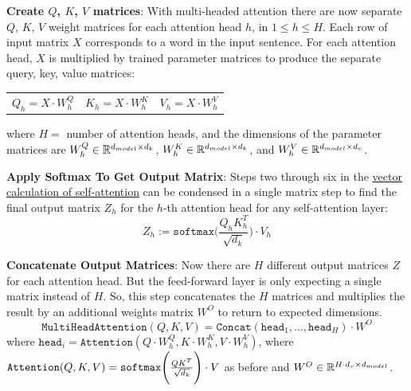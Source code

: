\begin{enumerateSpaced}{3pt}
    \item \textbf{Create $Q$, $K$, $V$ matrices}: With multi-headed attention there are now separate $Q$, $K$, $V$ weight matrices for each attention head $h$, in $1 \leq h \leq H$. Each row of input matrix $X$ corresponds to a word in the input sentence. For each attention head, $X$ is multiplied by trained parameter matrices to produce the separate query, key, value matrices: 
    \begin{center}
    \begin{tabular}{ c  c  c }
    $Q_h = X \cdot W_h^Q$
    &
    $K_h = X \cdot W_h^K $
    &
    $V_h = X \cdot W_h^V $
    \end{tabular}
    \end{center}\label{eq:QKVMultihead}

    where $H =$ number of attention heads, and the dimensions of the parameter matrices are $\large W_h^Q \in \mathbb{R}^{\Large d_{model} \times d_k}$, $\large W_h^K \in \mathbb{R}^{\Large d_{model} \times d_k}$, and $\large W_h^V \in \mathbb{R}^{\Large d_{model} \times d_v}$. 
    
    \item \textbf{Apply Softmax To Get Output Matrix}: Steps two through six in the \hyperref[app:TransformerSelfAttnCalc]{vector calculation of self-attention} can be condensed in a single matrix step to find the final output matrix $Z_h$ for the $h$-th attention head for any self-attention layer:
    \begin{equation}
    Z_h := \texttt{softmax} \Bigg(\frac {Q_h K_h^T} {\sqrt{d_k}} \Bigg) \cdot V_h
    \label{eq:ZMultihead}
    \end{equation}
    
    \item \textbf{Concatenate Output Matrices}: Now there are $H$ different output matrices $Z$ for each attention head. But the feed-forward layer is only expecting a single matrix instead of $H$. So, this step concatenates the $H$ matrices and multiplies the result by an additional weights matrix $W^O$ to return to expected dimensions. 
    \begin{equation}
    \texttt{MultiHeadAttention}(Q, K, V) = \texttt{Concat}(\texttt{head}_1, ..., \texttt{head}_H) \cdot W^O
    \label{eq:MultiheadAttention}
    \end{equation}
      where $\texttt{head}_i = \texttt{Attention}(Q \cdot W_h^Q, K \cdot W_h^K, V \cdot W_h^V)$, where $\texttt{Attention}(Q, K, V) = \texttt{softmax} \Bigg( \frac {\Large QK^T} {\Large \sqrt{d_k}} \Bigg) \cdot V$ as before and  $W^O \in \mathbb{R}^{\Large H \cdot d_v \times d_{model}}$.
    
    
\end{enumerateSpaced}



